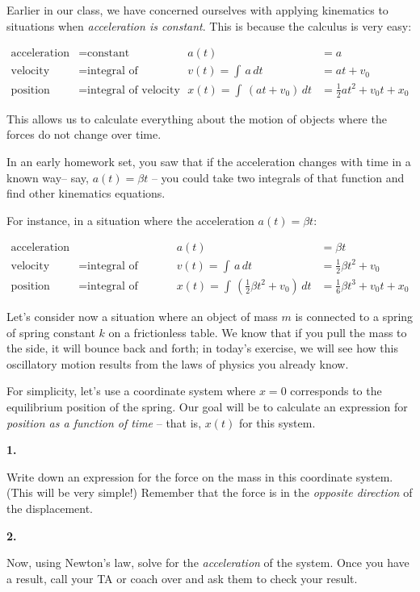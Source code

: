 \documentclass[12pt]{article}
\begin{document}
\Large
\centerline{}
\normalsize
\centerline{}

Earlier in our class, we have concerned ourselves with applying kinematics to situations when {\it acceleration is constant}. This is because the calculus is very easy:

\begin{align*}
\text {acceleration} &= \text{constant} &   a(t )&= a \\
\text {velocity} &= \text{integral of acceleration} & v(t) = \int\,a\, dt  &= at + v_0 \\
\text {position} &= \text{integral of velocity} & x(t) = \int\,(at + v_0)\,dt &= \frac{1}{2}at^2 + v_0 t + x_0
\end{align*}

This allows us to calculate everything about the motion of objects where the forces do not change over time.

In an early homework set, you saw that if the acceleration changes with time in a known way-- say, $a(t) = \beta t$ -- you could take two integrals of that function and find other kinematics equations. 


\newpage

For instance, in a situation where the acceleration $a(t) = \beta t$:


\begin{align*}
\text {acceleration} & &    a(t )&= \beta t \\
\text {velocity} &= \text{integral of acceleration} & v(t) = \int\,a\, dt  &= \frac{1}{2}\beta t^2 + v_0 \\
\text {position} &= \text{integral of velocity} & x(t) = \int\,\left(\frac{1}{2}\beta t^2 + v_0\right)\,dt &= \frac{1}{6} \beta t^3 + v_0 t + x_0
\end{align*}
\bigskip

Let's consider now a situation where an object of mass $m$ is connected to a spring of spring constant $k$ on a frictionless table. We know that if you pull the mass to the side, it will bounce back and forth; in today's exercise, we will see how this oscillatory motion results from the laws of physics you already know.

For simplicity, let's use a coordinate system where $x=0$ corresponds to the equilibrium position of the spring. Our goal will be to calculate an expression for {\it position as a function of time} -- that is, $x(t)$ for this system.


{\bf 1.}
\begin{minipage}{0.4\textwidth}
Write down an expression for the force on the mass in this coordinate system. (This will be very simple!) Remember that the force is in the {\it opposite direction} of the displacement.
\end{minipage}
\hspace{0.1\textwidth}
{\bf 2.}
\begin{minipage}{0.46\textwidth}
Now, using Newton's law, solve for the {\it acceleration} of the system. Once you have a result, call your TA or coach over and ask them to check your result. 
\end{minipage}
\end{document}
